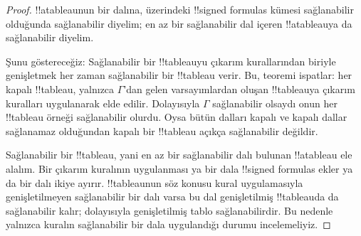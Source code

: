 \begin{proof}
!!a{tableau}{}nun bir dalına, üzerindeki !!{signed formula}s kümesi
sağlanabilir olduğunda sağlanabilir diyelim; en az bir sağlanabilir dal içeren
!!a{tableau}{}ya da sağlanabilir diyelim.

Şunu göstereceğiz: Sağlanabilir bir !!{tableau}{}yu çıkarım kurallarından
biriyle genişletmek her zaman sağlanabilir bir !!{tableau} verir. Bu, teoremi
ispatlar: her kapalı !!{tableau}, yalnızca $\Gamma$'dan gelen varsayımlardan
oluşan !!{tableau}{}ya çıkarım kuralları uygulanarak elde edilir. Dolayısıyla
$\Gamma$ sağlanabilir olsaydı onun her !!{tableau} örneği sağlanabilir olurdu.
Oysa bütün dalları kapalı ve kapalı dallar sağlanamaz olduğundan kapalı bir
!!{tableau} açıkça sağlanabilir değildir.

Sağlanabilir bir !!{tableau}, yani en az bir sağlanabilir dalı bulunan
!!a{tableau} ele alalım. Bir çıkarım kuralının uygulanması ya bir dala
!!{signed formula}s ekler ya da bir dalı ikiye ayırır. !!{tableau}{}nun söz
konusu kural uygulamasıyla genişletilmeyen sağlanabilir bir dalı varsa bu dal
genişletilmiş !!{tableau}{}da da sağlanabilir kalır; dolayısıyla genişletilmiş
tablo sağlanabilirdir. Bu nedenle yalnızca kuralın sağlanabilir bir dala
uygulandığı durumu incelemeliyiz.


\end{proof}
